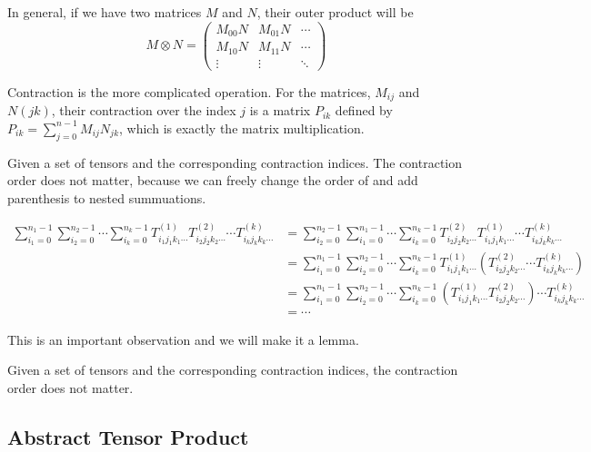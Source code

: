 In general, if we have two matrices $M$ and $N$, their outer product will be 
\begin{equation}
	M \otimes N = 
	\begin{pmatrix}
		M_{00} N & M_{01} N & \cdots \\
		M_{10} N & M_{11} N & \cdots \\
		\vdots & \vdots & \ddots
	\end{pmatrix}
\end{equation}

Contraction is the more complicated operation. 
For the matrices, $M_{ij}$ and $N(jk)$, their contraction over the index $j$ is a matrix $P_{ik}$ defined by $P_{ik} = \sum_{j=0}^{n-1} M_{ij} N_{jk}$, which is exactly the matrix multiplication.

Given a set of tensors and the corresponding contraction indices. 
The contraction order does not matter, because we can freely change the order of and add parenthesis to nested summuations.

\begin{equation}
	\begin{split}
		\sum_{i_1=0}^{n_1-1} \sum_{i_2=0}^{n_2-1} \cdots \sum_{i_k=0}^{n_k-1} T^{(1)}_{i_1 j_1 k_1 \cdots} T^{(2)}_{i_2 j_2 k_2 \cdots} \cdots T^{(k)}_{i_k j_k k_k \cdots} 
		&=
		\sum_{i_2=0}^{n_2-1} \sum_{i_1=0}^{n_1-1} \cdots \sum_{i_k=0}^{n_k-1} T^{(2)}_{i_2 j_2 k_2 \cdots} T^{(1)}_{i_1 j_1 k_1 \cdots} \cdots T^{(k)}_{i_k j_k k_k \cdots} \\ 
		&= \sum_{i_1=0}^{n_1-1} \sum_{i_2=0}^{n_2-1} \cdots \sum_{i_k=0}^{n_k-1} T^{(1)}_{i_1 j_1 k_1 \cdots} \left( T^{(2)}_{i_2 j_2 k_2 \cdots} \cdots T^{(k)}_{i_k j_k k_k \cdots} \right) \\
		&= \sum_{i_1=0}^{n_1-1} \sum_{i_2=0}^{n_2-1} \cdots \sum_{i_k=0}^{n_k-1} \left( T^{(1)}_{i_1 j_1 k_1 \cdots} T^{(2)}_{i_2 j_2 k_2 \cdots} \right) \cdots T^{(k)}_{i_k j_k k_k \cdots} \\
		&= \cdots
	\end{split}
\end{equation}\label{eq:contraction-order}

This is an important observation and we will make it a lemma. 
\begin{lemma}
	Given a set of tensors and the corresponding contraction indices, the contraction order does not matter.
\end{lemma} \label{lem:contraction-order}

\subsection{Abstract Tensor Product}

